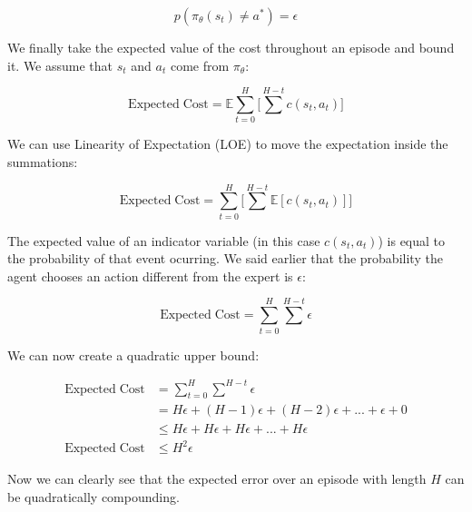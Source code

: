 \begin{flushleft}
    $$p(\pi_\theta(s_t) \neq a^*) = \epsilon$$

    We finally take the expected value of the cost throughout an episode and bound it. We assume that $s_t$ and $a_t$ come from $\pi_\theta$:

    $$\mathrm{Expected\;Cost} = \mathbb{E}\sum_{t=0}^H \biggl[ \sum^{H-t} c(s_t, a_t)\biggr]$$

    We can use Linearity of Expectation (LOE) to move the expectation inside the summations:

    $$\mathrm{Expected\;Cost} = \sum_{t=0}^H \biggl[ \sum^{H-t} \mathbb{E}[c(s_t, a_t)]\biggr]$$

    The expected value of an indicator variable (in this case $c(s_t,a_t)$) is equal to the probability of that event ocurring. We said earlier that the probability the agent chooses an action different from the expert is $\epsilon$:

    $$\mathrm{Expected\;Cost} = \sum_{t=0}^H \sum^{H-t} \epsilon$$

    We can now create a quadratic upper bound:

    \begin{align*}
        \mathrm{Expected\;Cost} &= \sum_{t=0}^H \sum^{H-t} \epsilon \\
        &= H\epsilon + (H-1)\epsilon + (H-2)\epsilon +...+ \epsilon + 0\\
        &\leq H\epsilon + H\epsilon + H\epsilon +...+ H\epsilon\\
        \mathrm{Expected\;Cost} &\leq H^2\epsilon
    \end{align*}

    Now we can clearly see that the expected error over an episode with length $H$ can be quadratically compounding.
\end{flushleft}

